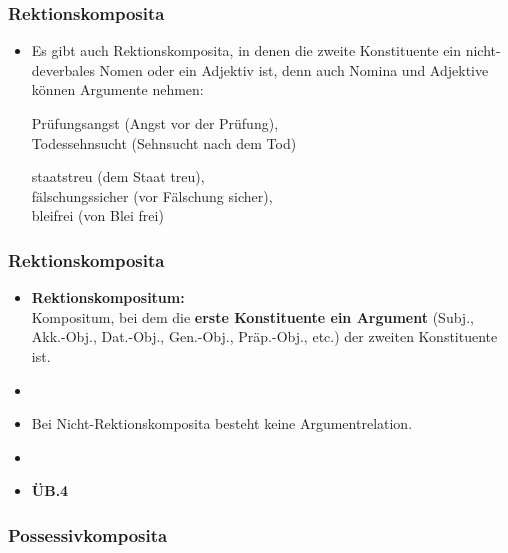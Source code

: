 \begin{frame}
\frametitle{Rektionskomposita}

\begin{itemize}
	\item Es gibt auch Rektionskomposita, in denen die zweite Konstituente ein nicht-deverbales Nomen oder ein Adjektiv ist, denn auch Nomina und Adjektive können Argumente nehmen:
	
	\ea Prüfungsangst (Angst vor der Prüfung), \\
		 Todessehnsucht (Sehnsucht nach dem Tod)
	\z
		 
	\ea staatstreu (dem Staat treu), \\
		 fälschungssicher (vor Fälschung sicher), \\
		 bleifrei (von Blei frei)
	\z
		 
\end{itemize}


\end{frame}


\begin{frame}
\frametitle{Rektionskomposita}

\begin{itemize}
	\item \textbf{Rektionskompositum:} \\
	Kompositum, bei dem die \textbf{erste Konstituente ein Argument} (Subj., Akk.-Obj., Dat.-Obj., Gen.-Obj., Präp.-Obj., etc.) der zweiten Konstituente ist.
	\item[]
	\item Bei Nicht-Rektionskomposita besteht keine Argumentrelation.
	\item[]
	\item[] \textbf{ÜB.4}
	
\end{itemize}


\end{frame}


\subsubsection{Possessivkomposita}


